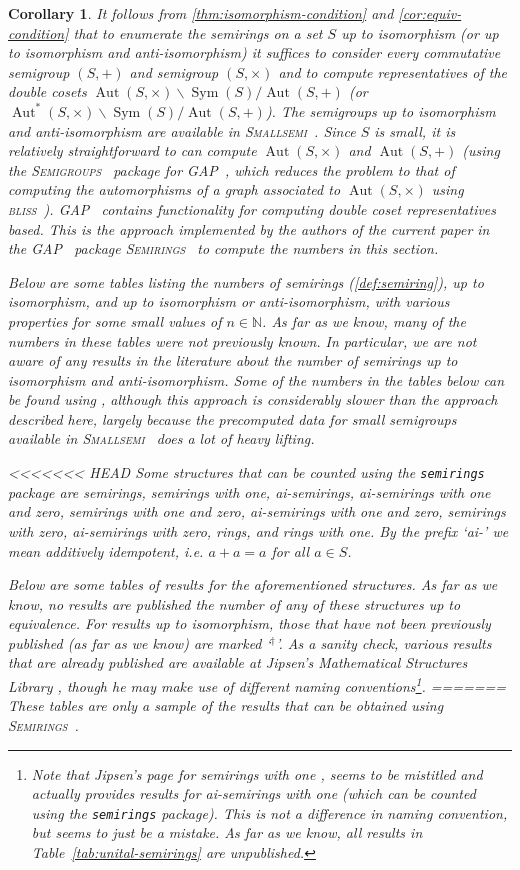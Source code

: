 \documentclass{article}
\theoremstyle{definition}
\theoremstyle{plain}
\newtheorem{cor}[defn]{Corollary}
\newcommand{\GAP}{\textsc{GAP}~\cite{GAP4}\xspace}
\newcommand{\Smallsemi}{\textsc{Smallsemi}~\cite{Smallsemi}\xspace}
\newcommand{\Semigroups}{\textsc{Semigroups}~\cite{Semigroups}\xspace}
\newcommand{\Semirings}{\textsc{Semirings}~\cite{Semirings}\xspace}
\newcommand{\bliss}{\textsc{bliss}~\cite{bliss, junttila2007}\xspace}
\newcommand{\Sym}{\operatorname{Sym}}
\newcommand{\Aut}{\operatorname{Aut}}
\begin{document}
\begin{cor}
It follows from \cref{thm:isomorphism-condition} and \cref{cor:equiv-condition}
that to enumerate the semirings on a set $S$ up to isomorphism (or up to
isomorphism and anti-isomorphism) it suffices to consider every commutative
semigroup $(S, +)$ and semigroup $(S, \times)$ and to compute representatives
of the double cosets \(\Aut(S, \times) \backslash \Sym(S) / \Aut(S, +)\) (or
\(\Aut^*(S, \times) \backslash \Sym(S) / \Aut(S, +)\)). The semigroups up to
isomorphism and anti-isomorphism are available in \Smallsemi.  Since $S$ is
small, it is relatively straightforward to can compute $\Aut(S, \times)$ and
$\Aut(S, +)$ (using the \Semigroups package for \GAP, which reduces
  the problem to that of computing the automorphisms of a graph
associated to $\Aut(S, \times)$ using \bliss). \GAP contains
functionality for computing double coset
representatives based. %
This is the approach implemented by the authors of the current paper in the
\GAP package \Semirings to compute the numbers in this section.

Below are some tables listing the numbers of semirings (\cref{def:semiring}),
up to isomorphism, and up to isomorphism or anti-isomorphism, with various
properties for some small values of $n\in \mathbb{N}$.
As far as we know, many of the numbers in these tables were not previously
known. In particular, we are not aware of any results in the literature about
the number of semirings up to isomorphism and anti-isomorphism.
Some of the numbers in the tables below can be found using
\cite{baueralg}, although this approach is considerably slower than the
approach described here, largely because the precomputed data for small
semigroups available in \Smallsemi does a lot of heavy lifting.

<<<<<<< HEAD
Some structures that can be counted using the
\texttt{semirings} package are semirings, semirings with one, ai-semirings, ai-semirings with one and zero, semirings with one and zero, ai-semirings with one and zero, semirings with zero, ai-semirings with zero, rings, and rings with one. By the prefix `ai-' we mean additively idempotent, i.e. $a + a = a$ for all $a\in S$.

Below are some tables of results for the aforementioned structures.
As far as we know, no results are published the number of any of
these structures up to equivalence. For results up to isomorphism,
those that have not been previously published (as far as we know) are
marked `$^\dagger$'. As a sanity check, various results that are already
published are available at Jipsen's Mathematical
Structures Library \cite{MathStructures}, though he may make use of different naming
conventions\footnote{Note that Jipsen's page
  for \emph{semirings with one} \cite{MSsemiringsWithOne}, seems to be mistitled and actually
  provides results for ai-semirings with one (which can be counted
  using the \texttt{semirings} package). This is not a difference in
  naming convention, but seems to just be a mistake. As far as we know,
all results in Table~\ref{tab:unital-semirings} are unpublished.}.
=======
These tables are only a sample of the results that can be obtained
using \Semirings.


\end{cor}
\end{document}
